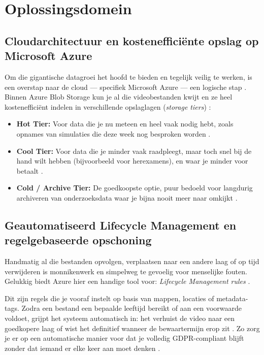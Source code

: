 \section{Oplossingsdomein}%
\label{subsec:lit_oplossingsdomein}

\subsection{Cloudarchitectuur en kostenefficiënte opslag op Microsoft Azure}
Om die gigantische datagroei het hoofd te bieden en tegelijk veilig te werken, is een overstap naar de cloud — specifiek Microsoft Azure — een logische stap \parencite{AzureWellArchitected2026}. Binnen Azure Blob Storage kun je al die videobestanden kwijt en ze heel kostenefficiënt indelen in verschillende opslaglagen (\emph{storage tiers}) \parencite{AzureLifecycle2026}:
\begin{itemize}
    \item \textbf{Hot Tier:} Voor data die je nu meteen en heel vaak nodig hebt, zoals opnames van simulaties die deze week nog besproken worden \parencite{AzureLifecycle2026}.
    \item \textbf{Cool Tier:} Voor data die je minder vaak raadpleegt, maar toch snel bij de hand wilt hebben (bijvoorbeeld voor herexamens), en waar je minder voor betaalt \parencite{AzureLifecycle2026}.
    \item \textbf{Cold / Archive Tier:} De goedkoopste optie, puur bedoeld voor langdurig archiveren van onderzoeksdata waar je bijna nooit meer naar omkijkt \parencite{AzureWellArchitected2026}.
\end{itemize}

\subsection{Geautomatiseerd Lifecycle Management en regelgebaseerde opschoning}
Handmatig al die bestanden opvolgen, verplaatsen naar een andere laag of op tijd verwijderen is monnikenwerk en simpelweg te gevoelig voor menselijke fouten. Gelukkig biedt Azure hier een handige tool voor: \emph{Lifecycle Management rules} \parencite{AzureLifecycle2026}.

Dit zijn regels die je vooraf instelt op basis van mappen, locaties of metadata-tags. Zodra een bestand een bepaalde leeftijd bereikt of aan een voorwaarde voldoet, grijpt het systeem automatisch in: het verhuist de video naar een goedkopere laag of wist het definitief wanneer de bewaartermijn erop zit \parencite{AzureLifecycle2026}. Zo zorg je er op een automatische manier voor dat je volledig GDPR-compliant blijft zonder dat iemand er elke keer aan moet denken \parencite{AzureWellArchitected2026}.


